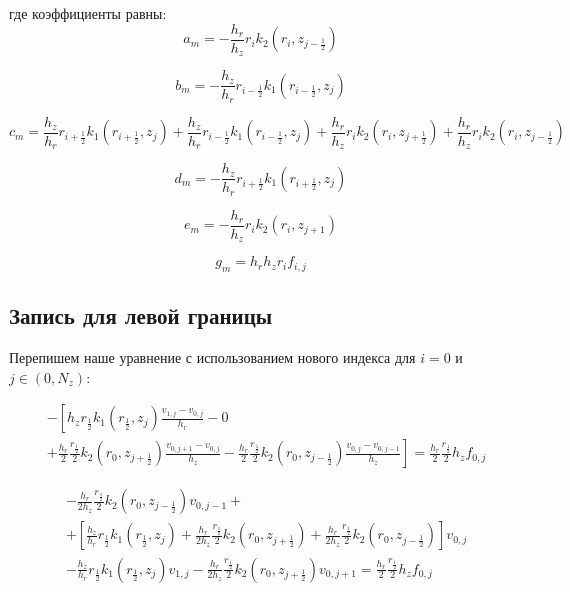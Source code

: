 где коэффициенты равны:
\[
  a_m = -\frac{h_r}{h_z} r_i k_2(r_i, z_{j - \frac{1}{2}})
\]

\[
  b_m = - \frac{h_z}{h_r} r_{i - \frac{1}{2}} k_1(r_{i - \frac{1}{2}}, z_j)
\]

\[
  c_m = \frac{h_z}{h_r} r_{i + \frac{1}{2}} k_1(r_{i + \frac{1}{2}}, z_j) + \frac{h_z}{h_r} r_{i - \frac{1}{2}} k_1(r_{i - \frac{1}{2}}, z_j) +
  \frac{h_r}{h_z} r_i k_2 (r_i, z_{j + \frac{1}{2}}) + \frac{h_r}{h_z} r_i k_2 (r_i, z_{j-\frac{1}{2}})
\]

\[
  d_m = - \frac{h_z}{h_r} r_{i + \frac{1}{2}} k_1(r_{i+ \frac{1}{2}}, z_j)
\]

\[
  e_m = - \frac{h_r}{h_z} r_i k_2(r_i, z_{j + 1})
\]

\[
  g_m = h_r h_z r_i f_{i, j}
\]

\subsection{Запись для левой границы}

Перепишем наше уравнение с использованием нового индекса для $i = 0$ и $ j \in (0, N_z) $:

\begin{align*}
  &- \left [ 
    h_z r_{\frac{1}{2}} k_1(r_{\frac{1}{2}}, z_j) \frac{v_{1, j} - v_{0, j}}{h_{r}}
    - 0
    \right . \\
    &\left .
    + \frac{h_r}{2} \frac{r_{\frac{1}{2}}}{2} k_2(r_0, z_{j+\frac{1}{2}}) \frac{v_{0, j + 1} - v_{0, j}}{h_{z}}
    - \frac{h_r}{2} \frac{r_{\frac{1}{2}}}{2} k_2(r_0, z_{j-\frac{1}{2}}) \frac{v_{0, j} - v_{0, j - 1}}{h_z}
    \right ]  = \frac{h_r}{2} \frac{r_{\frac{1}{2}}}{2} h_z f_{0, j}
\end{align*}

\begin{align*}
  & - \frac{h_r}{2 h_z} \frac{r_{\frac{1}{2}}}{2} k_2(r_0, z_{j - \frac{1}{2}}) v_{0, j - 1} + \\
  & + \left[
    \frac{h_z}{h_r} r_{\frac{1}{2}} k_1(r_{\frac{1}{2}}, z_j) + \frac{h_r}{2 h_z} \frac{r_{\frac{1}{2}}}{2} k_2(r_0, z_{j+\frac{1}{2}})
    + \frac{h_r}{2 h_z} \frac{r_{\frac{1}{2}}}{2} k_2(r_0, z_{j -\frac{1}{2}})
  \right] v_{0, j} \\
  & - \frac{h_z}{h_r} r_{\frac{1}{2}} k_1(r_{\frac{1}{2}}, z_j) v_{1, j}
  - \frac{h_r}{2 h_z} \frac{r_{\frac{1}{2}}}{2} k_2(r_0, z_{j + \frac{1}{2}}) v_{0, j + 1} = \frac{h_r}{2} \frac{r_{\frac{1}{2}}}{2} h_z f_{0, j}
\end{align*}

